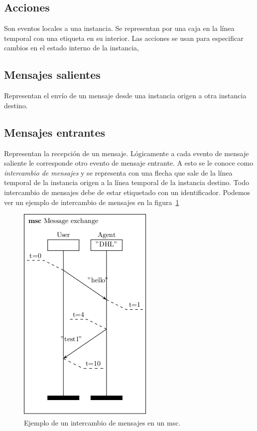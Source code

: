 \subsection*{Acciones}
Son eventos locales a una instancia. Se representan por una caja en la
línea temporal con una etiqueta en su interior. Las acciones se usan
para especificar cambios en el estado interno de la instancia,
\subsection*{Mensajes salientes} 
Representan el envío de un mensaje desde una instancia origen a otra
instancia destino.
\subsection*{Mensajes entrantes}
Representan la recepción de un mensaje. Lógicamente a cada evento de
mensaje saliente le corresponde otro evento de mensaje entrante. A
esto se le conoce como \textit{intercambio de mensajes} y se representa con una
flecha que sale de la línea temporal de la instancia origen a la
línea temporal de la instancia destino. Todo intercambio de mensajes
debe de estar etiquetado con un identificador. Podemos ver un ejemplo
de intercambio de mensajes en la figura~\ref{fig:message_exchange}

\begin{figure}
  \centering
  \includegraphics[scale=1]{./images/message exchange.png}
  \caption{Ejemplo de un intercambio de mensajes en un msc.}
  \label{fig:message_exchange}
\end{figure}

